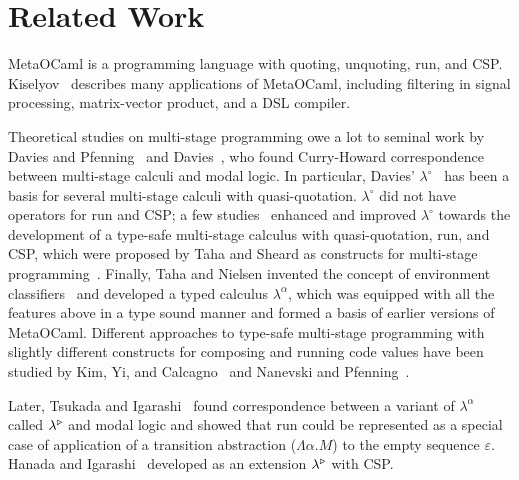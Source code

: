 
\section{Related Work}
\label{sec:related-work}

MetaOCaml is a programming language with quoting, unquoting, run, and
CSP.  Kiselyov~\cite{8384206} describes many applications of MetaOCaml, including filtering in signal processing, matrix-vector product,
and a DSL compiler.  


Theoretical studies on multi-stage programming owe a lot to seminal
work by Davies and Pfenning~\cite{DaviesPfenning01JACM} and
Davies~\cite{davies1996temporal}, who found Curry-Howard
correspondence between multi-stage calculi and modal logic.  In
particular, Davies' $\lambda^\circ$~\cite{davies1996temporal} has been
a basis for several multi-stage calculi with quasi-quotation.  $\lambda^\circ$
did not have operators for run and CSP; a few
studies~\cite{benaissa1999logical,MoggiTahaBenaissaSheard99ESOP}
enhanced and improved $\lambda^\circ$ towards the development of a
type-safe multi-stage calculus with quasi-quotation, run, and CSP,
which were proposed by Taha and Sheard as constructs for multi-stage
programming~\cite{MetaML}.
Finally, Taha and Nielsen invented the concept of environment
classifiers~\cite{taha2003environment} and developed a typed calculus
$\lambda^\alpha$, which was equipped with all the features above in a
type sound manner and formed a basis of earlier versions of MetaOCaml.
Different approaches to type-safe multi-stage programming with
slightly different constructs for composing and running code values have been studied by Kim, Yi,
and Calcagno~\cite{DBLP:conf/popl/KimYC06} and Nanevski and Pfenning~\cite{DBLP:journals/jfp/NanevskiP05}.

Later, Tsukada and Igarashi~\cite{Tsukada} found correspondence
between a variant of \(\lambda^\alpha\) called $\lambda^{\mathop{\triangleright}}$
and modal logic and showed that run could be represented as a special
case of application of a transition abstraction ($\Lambda\alpha.M$) to
the empty sequence $\varepsilon$.  Hanada and
Igarashi~\cite{Hanada2014} developed \LTP as an extension
$\lambda^{\mathop{\triangleright}}$ with CSP.


